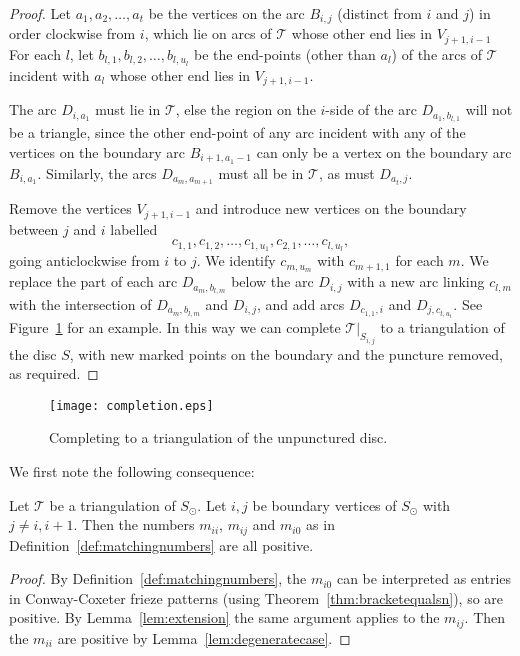 \documentclass[a4paper]{amsart}
\begin{document}
\begin{proof}
Let $a_1,a_2,\ldots ,a_t$ be the vertices on the arc $B_{i,j}$
(distinct from $i$ and $j$) in order clockwise from $i$, which lie on
arcs of ${\mathcal T}$ whose other end lies in $V_{j+1,i-1}$
For each $l$, let $b_{l,1},b_{l,2},\ldots ,b_{l,u_l}$ be the end-points
(other than $a_l$) of the arcs of ${\mathcal T}$ incident with $a_l$ whose
other end lies in $V_{j+1,i-1}$.

The arc $D_{i,a_1}$ must lie in ${\mathcal T}$, else the region on the $i$-side
of the arc $D_{a_1,b_{l,1}}$ will not be a triangle, since the other
end-point of any arc incident with any of the vertices
on the boundary arc $B_{i+1,a_1-1}$ can only be a vertex on the boundary
arc $B_{i,a_1}$. Similarly, the arcs $D_{a_m,a_{m+1}}$ must all be in ${\mathcal T}$,
as must $D_{a_t,j}$.

Remove the vertices $V_{j+1,i-1}$ and introduce new vertices on the boundary
between $j$ and $i$ labelled
$$c_{1,1},c_{1,2},\ldots ,c_{1,u_1},c_{2,1},\ldots  ,c_{l,u_l},$$
going anticlockwise from $i$ to $j$. We identify $c_{m,u_m}$ with
$c_{m+1,1}$ for each $m$. We replace the part of each arc
$D_{a_m,b_{l,m}}$ below the arc $D_{i,j}$
with a new arc linking $c_{l,m}$ with the intersection of $D_{a_m,b_{l,m}}$ and
$D_{i,j}$, and add arcs $D_{c_{1,1},i}$ and $D_{j,c_{t,u_t}}$.
See Figure~\ref{fig:completion} for an example.
In this way we can complete ${\mathcal T}|_{S_{i,j}}$ to a triangulation
of the disc $S$, with new marked points on the boundary and the
puncture removed, as required.
\end{proof}

\begin{figure}
\begin{center}
\texttt{[image: completion.eps]}
\caption{Completing to a triangulation of the unpunctured disc.}
\label{fig:completion}
\end{center}
\end{figure}

We first note the following consequence:

\begin{lemma} \label{lem:positivenumbers}
Let ${\mathcal T}$ be a triangulation of $S_{\odot}$.
Let $i,j$ be boundary vertices of $S_{\odot}$ with $j\neq i,i+1$.
Then the numbers $m_{ii}$, $m_{ij}$ and $m_{i0}$
as in Definition~\ref{def:matchingnumbers} are all positive.
\end{lemma}

\begin{proof}
By Definition~\ref{def:matchingnumbers}, the $m_{i0}$ can be interpreted
as entries in Conway-Coxeter frieze patterns (using
Theorem~\ref{thm:bracketequalsn}), so are positive. By Lemma~\ref{lem:extension}
the same argument applies to the $m_{ij}$. Then the $m_{ii}$ are positive
by Lemma~\ref{lem:degeneratecase}.
\end{proof}
\end{document}
